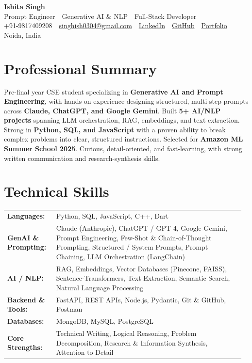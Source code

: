 \documentclass[a4paper,10.5pt]{article}
\begin{document}
\begin{center}
  {\fontsize{22}{26}\selectfont \textbf{\color{accent}Ishita Singh}}\\[3pt]
  {\small Prompt Engineer \,\textbar\, Generative AI \& NLP \,\textbar\, Full-Stack Developer}\\[5pt]
  {\small
    +91-9817409208
    \,\textbar\,
    \href{mailto:singhish0304@gmail.com}{singhish0304@gmail.com}
    \,\textbar\,
    \href{https://linkedin.com/in/ishita-singh-7b98752aa}{LinkedIn}
    \,\textbar\,
    \href{https://github.com/Ishita-coder27}{GitHub}
    \,\textbar\,
    \href{https://portfolioo-jade-iota.vercel.app/}{Portfolio}
    \,\textbar\,
    Noida, India
  }
\end{center}

\vspace{2pt}

\section*{Professional Summary}

Pre-final year CSE student specializing in \textbf{Generative AI and Prompt Engineering}, with hands-on experience designing structured, multi-step prompts across \textbf{Claude, ChatGPT, and Google Gemini}. Built \textbf{5+ AI/NLP projects} spanning LLM orchestration, RAG, embeddings, and text extraction. Strong in \textbf{Python, SQL, and JavaScript} with a proven ability to break complex problems into clear, structured instructions. Selected for \textbf{Amazon ML Summer School 2025}. Curious, detail-oriented, and fast-learning, with strong written communication and research-synthesis skills.

\section*{Technical Skills}

\begin{tabular}{@{}p{0.20\linewidth} p{0.77\linewidth}@{}}
\textbf{Languages:}           & Python, SQL, JavaScript, C++, Dart \\[2pt]
\textbf{GenAI \& Prompting:}  & Claude (Anthropic), ChatGPT / GPT-4, Google Gemini, Prompt Engineering, Few-Shot \& Chain-of-Thought Prompting, Structured / System Prompts, Prompt Chaining, LLM Orchestration (LangChain) \\[2pt]
\textbf{AI / NLP:}            & RAG, Embeddings, Vector Databases (Pinecone, FAISS), Sentence-Transformers, Text Extraction, Semantic Search, Natural Language Processing \\[2pt]
\textbf{Backend \& Tools:}    & FastAPI, REST APIs, Node.js, Pydantic, Git \& GitHub, Postman \\[2pt]
\textbf{Databases:}          & MongoDB, MySQL, PostgreSQL \\[2pt]
\textbf{Core Strengths:}      & Technical Writing, Logical Reasoning, Problem Decomposition, Research \& Information Synthesis, Attention to Detail \\
\end{tabular}
\end{document}
